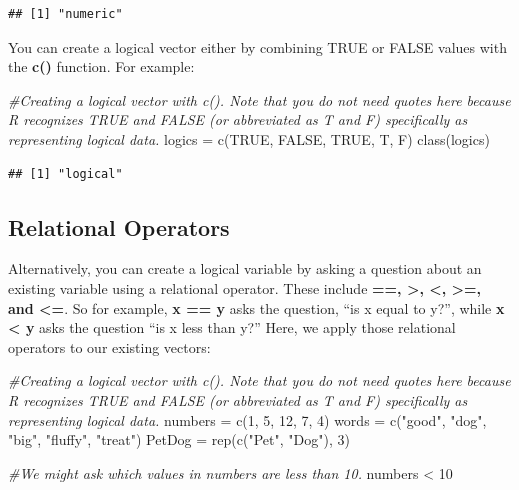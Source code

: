 \documentclass[
]{book}
\newenvironment{Shaded}{\begin{snugshade}}{\end{snugshade}}
\newcommand{\CommentTok}[1]{\textcolor[rgb]{0.56,0.35,0.01}{\textit{#1}}}
\newcommand{\ConstantTok}[1]{\textcolor[rgb]{0.00,0.00,0.00}{#1}}
\newcommand{\DecValTok}[1]{\textcolor[rgb]{0.00,0.00,0.81}{#1}}
\newcommand{\FunctionTok}[1]{\textcolor[rgb]{0.00,0.00,0.00}{#1}}
\newcommand{\NormalTok}[1]{#1}
\newcommand{\OtherTok}[1]{\textcolor[rgb]{0.56,0.35,0.01}{#1}}
\newcommand{\SpecialCharTok}[1]{\textcolor[rgb]{0.00,0.00,0.00}{#1}}
\newcommand{\StringTok}[1]{\textcolor[rgb]{0.31,0.60,0.02}{#1}}
\begin{document}
\begin{verbatim}
## [1] "numeric"
\end{verbatim}

You can create a logical vector either by combining TRUE or FALSE values with the \textbf{c()} function. For example:

\begin{Shaded}
\begin{Highlighting}[]
\CommentTok{\#Creating a logical vector with c(). Note that you do not need quotes here because R recognizes TRUE and FALSE (or abbreviated as T and F) specifically as representing logical data.}
\NormalTok{logics }\OtherTok{=} \FunctionTok{c}\NormalTok{(}\ConstantTok{TRUE}\NormalTok{, }\ConstantTok{FALSE}\NormalTok{, }\ConstantTok{TRUE}\NormalTok{, T, F)}
\FunctionTok{class}\NormalTok{(logics)}
\end{Highlighting}
\end{Shaded}

\begin{verbatim}
## [1] "logical"
\end{verbatim}

\hypertarget{relational-operators}{%
\subsection{Relational Operators}\label{relational-operators}}

Alternatively, you can create a logical variable by asking a question about an existing variable using a relational operator. These include \textbf{==, \textgreater, \textless, \textgreater=, and \textless=}. So for example, \textbf{x == y} asks the question, ``is x equal to y?'', while \textbf{x \textless{} y } asks the question ``is x less than y?'' Here, we apply those relational operators to our existing vectors:

\begin{Shaded}
\begin{Highlighting}[]
\CommentTok{\#Creating a logical vector with c(). Note that you do not need quotes here because R recognizes TRUE and FALSE (or abbreviated as T and F) specifically as representing logical data.}
\NormalTok{numbers }\OtherTok{=} \FunctionTok{c}\NormalTok{(}\DecValTok{1}\NormalTok{, }\DecValTok{5}\NormalTok{, }\DecValTok{12}\NormalTok{, }\DecValTok{7}\NormalTok{, }\DecValTok{4}\NormalTok{)   }
\NormalTok{words }\OtherTok{=} \FunctionTok{c}\NormalTok{(}\StringTok{"good"}\NormalTok{, }\StringTok{"dog"}\NormalTok{, }\StringTok{"big"}\NormalTok{, }\StringTok{"fluffy"}\NormalTok{, }\StringTok{"treat"}\NormalTok{)}
\NormalTok{PetDog }\OtherTok{=} \FunctionTok{rep}\NormalTok{(}\FunctionTok{c}\NormalTok{(}\StringTok{"Pet"}\NormalTok{, }\StringTok{"Dog"}\NormalTok{), }\DecValTok{3}\NormalTok{)}

\CommentTok{\#We might ask which values in numbers are less than 10. }
\NormalTok{numbers }\SpecialCharTok{\textless{}} \DecValTok{10}
\end{Highlighting}
\end{Shaded}
\end{document}
